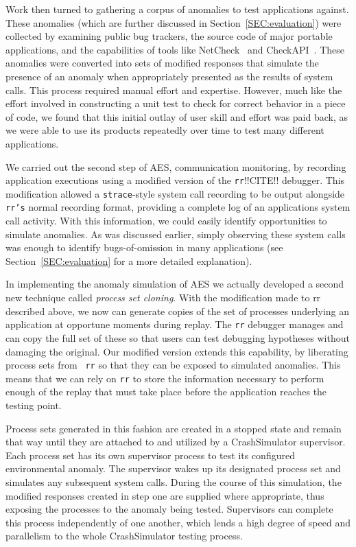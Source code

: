 Work then turned to gathering a corpus of anomalies to test applications
against.  These anomalies (which are further discussed
in Section~\ref{SEC:evaluation})
were collected by examining public bug trackers,
the source code of major portable applications, and the capabilities of
tools like NetCheck~\cite{Zhuang_NSDI_2014}
and CheckAPI~\cite{rasley2015detecting}.  These anomalies were converted
into sets of modified responses
that simulate the presence of an anomaly when
appropriately presented as the results of system calls.
This process required manual effort and expertise.  However,
much like
the effort involved in constructing a unit test to check for correct
behavior in a piece of code, we found that this initial outlay of
user skill and effort was paid back, as
we were able to use its products
repeatedly over time to test many different applications.

We carried out the second step of AES, communication monitoring, by
recording application executions
using a modified version of the {\tt rr}!!CITE!!
debugger.  This modification allowed
a {\tt strace}-style
system call recording to be output alongside {\tt rr's} normal recording
format, providing
a complete log of an applications system call activity.
With this information, we could
easily identify opportunities to simulate anomalies.  As was
discussed earlier, simply observing these system calls was enough to
identify bugs-of-omission in many applications
(see Section~\ref{SEC:evaluation} for a more detailed explanation).

In implementing the anomaly simulation of AES
we actually developed
a second new technique
called {\it process set cloning}.
With the modification made to rr described above,
we now can generate copies of the set of
processes underlying an application at opportune moments during replay.
The {\tt rr} debugger manages
and can copy
the full set of these
so that users can test debugging
hypotheses without damaging the original.
Our modified version
extends this capability, by liberating process sets from {\tt
rr} so that they can be exposed to simulated anomalies.
This means that we can rely on {\tt rr}
to store the information necessary to perform enough of the
replay that must take place before the application reaches the
testing point.

Process sets generated in this fashion are created in a stopped state and
remain that way until they are attached to and utilized by a CrashSimulator
supervisor.  Each process set has its own supervisor process to test
its configured environmental anomaly.  The
supervisor wakes up its designated process set
and simulates any
subsequent system calls.
During the course of this simulation, the modified responses created in
step one are supplied where appropriate,
thus exposing the processes to the
anomaly being tested.
Supervisors can complete this
process independently of one another, which lends a
high degree of speed and
parallelism to the whole CrashSimulator testing process.

